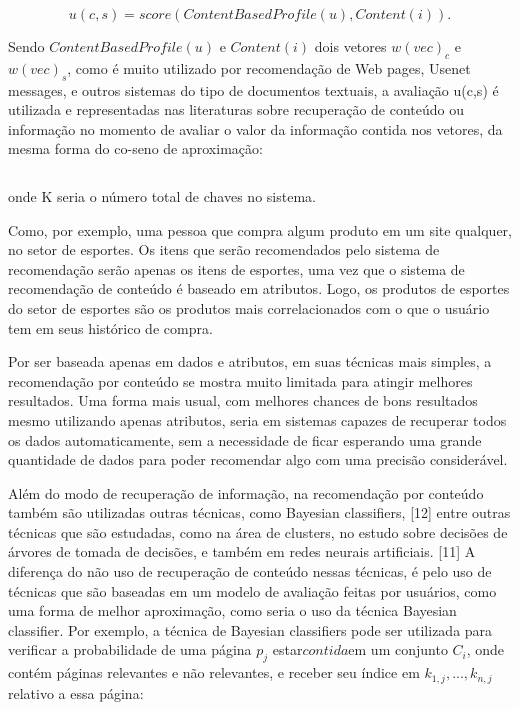 \documentclass[12pt,
				openright,
				twoside,
				a4paper,
				apter=TITLE,
				section=TITLE,
				subsection=TITLE,
				chapter=TITLE,
				english,
				brazil]{abntex2}
\begin{document}
\begin{equation}
 u(c,s) = score(ContentBasedProfile(u),Content(i)).
\end{equation}


Sendo $ContentBasedProfile(u)$ e $Content(i)$ dois vetores $w(vec)_c$ e $w(vec)_s$, como é muito utilizado por recomendação de Web pages, Usenet messages, e outros sistemas do tipo de documentos textuais, a avaliação u(c,s) é utilizada e representadas nas literaturas sobre recuperação de conteúdo ou informação no momento de avaliar o valor da informação contida nos vetores, da mesma forma do co-seno de aproximação:

\begin{equation}
\end{equation}

onde K seria o número total de chaves no sistema.

Como, por exemplo, uma pessoa que compra algum produto em um site qualquer, no setor de esportes. Os itens que serão recomendados pelo sistema de recomendação serão apenas os itens de esportes, uma vez que o sistema de recomendação de conteúdo é baseado em atributos. Logo, os produtos de esportes do setor de esportes são os produtos mais correlacionados com o que o usuário tem em seus histórico de compra. 

Por ser baseada apenas em dados e atributos, em suas técnicas mais simples, a recomendação por conteúdo se mostra muito limitada para atingir melhores resultados. Uma forma mais usual, com melhores chances de bons resultados mesmo utilizando apenas atributos, seria em sistemas capazes de recuperar todos os dados automaticamente, sem a necessidade de ficar esperando uma grande quantidade de dados para poder recomendar algo com uma precisão considerável. 

Além do modo de recuperação de informação, na recomendação por conteúdo também são utilizadas outras técnicas, como Bayesian classifiers, [12] entre outras técnicas que são estudadas, como na área de clusters, no estudo sobre decisões de árvores de tomada de decisões, e também em redes neurais artificiais. [11] A diferença do não uso de recuperação de conteúdo nessas técnicas, é pelo uso de técnicas que são baseadas em um modelo de avaliação feitas por usuários, como uma forma de melhor aproximação, como seria o uso da técnica Bayesian classifier. Por exemplo, a técnica de Bayesian classifiers pode ser utilizada para verificar a probabilidade de uma página $p_j$ estar$ contida $em um conjunto $C_i$, onde contém páginas relevantes e não relevantes, e receber seu índice em $k_{1,j},...,k_{n,j}$ relativo a essa página:
\end{document}
